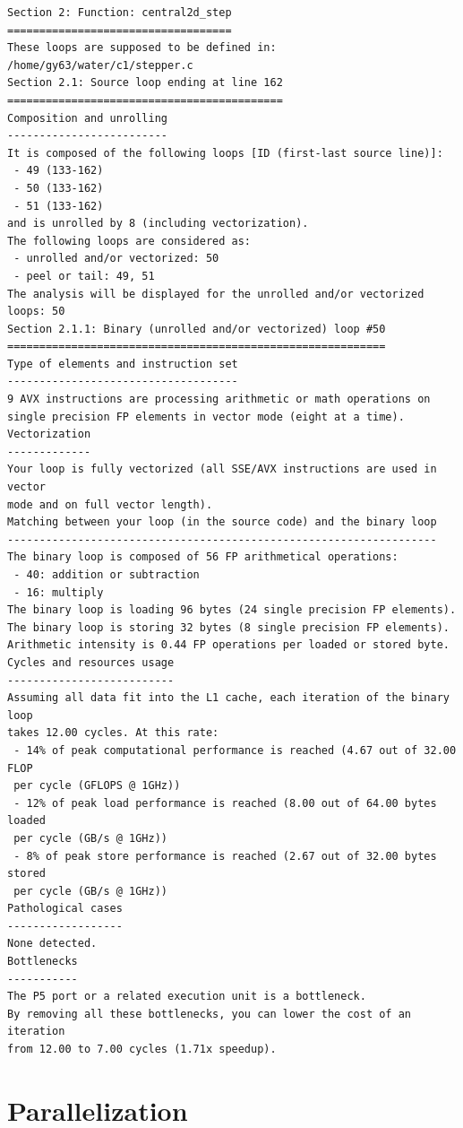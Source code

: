 \documentclass[12pt]{article}
\numberwithin{equation}{section}
\begin{document}
\scriptsize{
\begin{lstlisting}
Section 2: Function: central2d_step
===================================
These loops are supposed to be defined in: /home/gy63/water/c1/stepper.c
Section 2.1: Source loop ending at line 162
===========================================
Composition and unrolling
-------------------------
It is composed of the following loops [ID (first-last source line)]:
 - 49 (133-162)
 - 50 (133-162)
 - 51 (133-162)
and is unrolled by 8 (including vectorization).
The following loops are considered as:
 - unrolled and/or vectorized: 50
 - peel or tail: 49, 51
The analysis will be displayed for the unrolled and/or vectorized loops: 50
Section 2.1.1: Binary (unrolled and/or vectorized) loop #50
===========================================================
Type of elements and instruction set
------------------------------------
9 AVX instructions are processing arithmetic or math operations on
single precision FP elements in vector mode (eight at a time).
Vectorization
-------------
Your loop is fully vectorized (all SSE/AVX instructions are used in vector
mode and on full vector length).
Matching between your loop (in the source code) and the binary loop
-------------------------------------------------------------------
The binary loop is composed of 56 FP arithmetical operations:
 - 40: addition or subtraction
 - 16: multiply
The binary loop is loading 96 bytes (24 single precision FP elements).
The binary loop is storing 32 bytes (8 single precision FP elements).
Arithmetic intensity is 0.44 FP operations per loaded or stored byte.
Cycles and resources usage
--------------------------
Assuming all data fit into the L1 cache, each iteration of the binary loop
takes 12.00 cycles. At this rate:
 - 14% of peak computational performance is reached (4.67 out of 32.00 FLOP
 per cycle (GFLOPS @ 1GHz))
 - 12% of peak load performance is reached (8.00 out of 64.00 bytes loaded
 per cycle (GB/s @ 1GHz))
 - 8% of peak store performance is reached (2.67 out of 32.00 bytes stored
 per cycle (GB/s @ 1GHz))
Pathological cases
------------------
None detected.
Bottlenecks
-----------
The P5 port or a related execution unit is a bottleneck.
By removing all these bottlenecks, you can lower the cost of an iteration
from 12.00 to 7.00 cycles (1.71x speedup).
\end{lstlisting}
}




\section{Parallelization}
\end{document}
